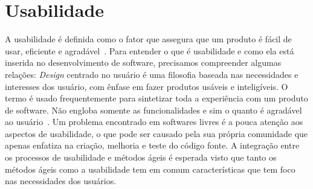 \section{Usabilidade}
\label{sec:usabilidade}

A usabilidade é definida como o fator que assegura que um produto é fácil de usar, eficiente e agradável~\cite{preece2007}.
%
Para entender o que é usabilidade e como ela está inserida no desenvolvimento de software, precisamos compreender algumas relações: 
%
\emph{Design} centrado no usuário é uma filosofia baseada nas necessidades e interesses dos usuário, com ênfase em fazer produtos usáveis e inteligíveis\cite{norman2006design}.
%
O termo é usado frequentemente para sintetizar toda a experiência com um produto de software. Não engloba somente as funcionalidades e sim o quanto é agradável ao usuário~\cite{travis2013}.
%
Um problema encontrado em softwares livres é a pouca atenção aos aspectos de usabilidade, o que pode ser causado pela sua própria comunidade que apenas enfatiza na criação, melhoria e teste do código fonte.  
%
A integração entre os processos de usabilidade e métodos ágeis é esperada visto que tanto os métodos ágeis como a usabilidade tem em comum características que tem foco nas necessidades dos usuários.
